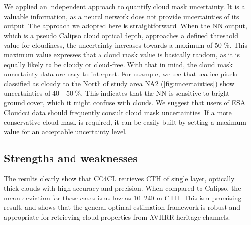 We applied an independent approach to quantify cloud mask uncertainty. It is a valuable information, as a neural network does not provide uncertainties of its output. The approach we adopted here is straightforward. When the NN output, which is a pseudo Calipso cloud optical depth, approaches a defined threshold value for cloudiness, the uncertainty increases towards a maximum of 50 \%. This maximum value expresses that a cloud mask value is basically random, as it is equally likely to be cloudy or cloud-free. With that in mind, the cloud mask uncertainty data are easy to interpret. For example, we see that sea-ice pixels classified as cloudy to the North of study area NA2 (\cref{fig:uncertainties}) show uncertainties of 40 - 50 \%. This indicates that the NN is sensitive to bright ground cover, which it might confuse with clouds. We suggest that users of ESA Cloud\textunderscore cci data should frequently consult cloud mask uncertainties. If a more conservative cloud mask is required, it can be easily built by setting a maximum value for an acceptable uncertainty level.

\subsection{Strengths and weaknesses}

The results clearly show that CC4CL retrieves CTH of single layer, optically thick clouds with high accuracy and precision. When compared to Calipso, the mean deviation for these cases is as low as 10--240 m CTH. This is a promising result, and shows that the general optimal estimation framework is robust and appropriate for retrieving cloud properties from AVHRR heritage channels. 

